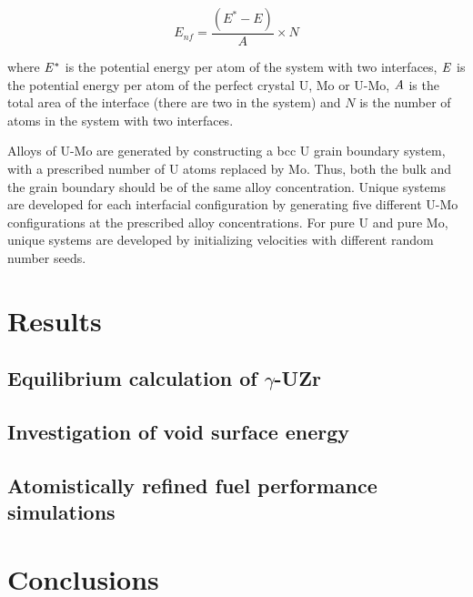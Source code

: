 \documentclass[review]{elsarticle}
\begin{document}
\begin{equation}
\label{eq:surface}
E_{nf}= \frac{(E^{*} - E)}{A} \times N
\end{equation}

where $\it{E^{*}}$ is the potential energy per atom of the system with two interfaces, $\it{E}$ is the potential energy per atom of the perfect crystal U, Mo or U-Mo, $\it{A}$ is the total area of the interface (there are two in the system) and $\textit{N}$ is the number of atoms in the system with two interfaces. 

Alloys of U-Mo are generated by constructing a bcc U grain boundary system, with a prescribed number of U atoms replaced by Mo. Thus, both the bulk and the grain boundary should be of the same alloy concentration. Unique systems are developed for each interfacial configuration by generating five different U-Mo configurations at the prescribed alloy concentrations. For pure U and pure Mo, unique systems are developed by initializing velocities with different random number seeds. 


\section{Results}
\subsection{Equilibrium calculation of $\gamma$-UZr}


\subsection{Investigation of void surface energy}


\subsection{Atomistically refined fuel performance simulations}



\FloatBarrier

\section{Conclusions}
\end{document}
